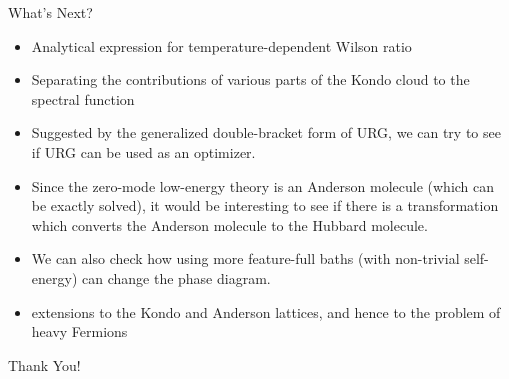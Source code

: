 \documentclass[aspectratio=169]{beamer}
\begin{document}
\begin{frame}[noframenumbering]{What's Next?}
\begin{itemize} 
\item Analytical expression for temperature-dependent Wilson ratio 
	\vspace{5pt}
\item Separating the contributions of various parts of the Kondo cloud to the spectral function
	\vspace{5pt}
\item Suggested by the generalized double-bracket form of URG, we can try to see if URG can be used as an optimizer.
	\vspace{5pt}
\item Since the zero-mode low-energy theory is an Anderson molecule (which can be exactly solved), it would be interesting to see if there is a transformation which converts the Anderson molecule to the Hubbard molecule.
	\vspace{5pt}
\item We can also check how using more feature-full baths (with non-trivial self-energy) can change the phase diagram.
	\vspace{5pt}
\item extensions to the Kondo and Anderson lattices, and hence to the problem of heavy Fermions
\end{itemize}
\end{frame}
\begin{frame}[noframenumbering]
	\LARGE \centering Thank You!
\end{frame}
\printbibliography
\end{document}

